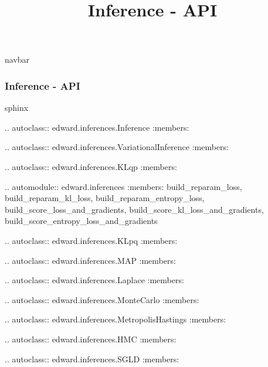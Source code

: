 \title{Inference - API}

{{navbar}}

\subsubsection{Inference - API}

{{sphinx

.. autoclass:: edward.inferences.Inference
   :members:

.. autoclass:: edward.inferences.VariationalInference
   :members:

.. autoclass:: edward.inferences.KLqp
   :members:

.. automodule:: edward.inferences
   :members: build_reparam_loss,
             build_reparam_kl_loss,
             build_reparam_entropy_loss,
             build_score_loss_and_gradients,
             build_score_kl_loss_and_gradients,
             build_score_entropy_loss_and_gradients

.. autoclass:: edward.inferences.KLpq
   :members:

.. autoclass:: edward.inferences.MAP
   :members:

.. autoclass:: edward.inferences.Laplace
   :members:

.. autoclass:: edward.inferences.MonteCarlo
   :members:

.. autoclass:: edward.inferences.MetropolisHastings
   :members:

.. autoclass:: edward.inferences.HMC
   :members:

.. autoclass:: edward.inferences.SGLD
   :members:


}}

